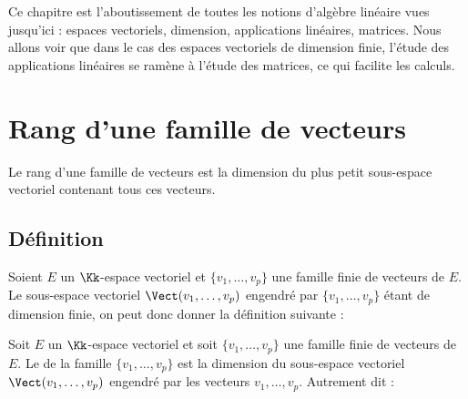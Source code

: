 \documentclass[class=report,crop=false]{standalone}
\begin{document}
\newcommand{\Pass}{\mathop{\mathrm{P}}\nolimits}








\bigskip


Ce chapitre est l'aboutissement de toutes les notions d'algèbre linéaire
vues jusqu'ici : espaces vectoriels, dimension, applications linéaires, matrices.
Nous allons voir que dans le cas des espaces vectoriels de dimension finie,
l'étude des applications linéaires se ramène à l'étude des matrices, ce qui
facilite les calculs.


\section{Rang d'une famille de vecteurs}

Le rang d'une famille de vecteurs est la dimension du plus petit sous-espace
vectoriel contenant tous ces vecteurs.

\subsection{Définition}


Soient $E$ un $\Kk$-espace vectoriel et $\{v_1, \ldots ,v_p\}$ une
famille finie de vecteurs de $E$. Le sous-espace vectoriel
$\Vect(v_1, \ldots ,v_p)$ engendré par $\{v_1, \ldots ,v_p\}$ étant de dimension
finie, on peut donc donner la définition suivante :

\begin{definition}
Soit $E$ un $\Kk$-espace vectoriel et soit $\{v_1, \ldots ,v_p\}$
une famille finie de vecteurs de $E$.
Le  de la famille $\{v_1, \ldots ,v_p\}$
est la dimension du sous-espace vectoriel $\Vect(v_1, \ldots ,v_p)$
engendré par les vecteurs $v_1, \dots ,v_p$.
Autrement dit :
\end{definition}
\end{document}
